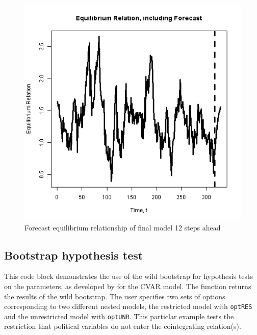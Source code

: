 \documentclass[article]{jss}
\newcommand{\fct}[1]{\code{#1()}}
\begin{document}
\begin{figure}[H]
  \centering
  \includegraphics[scale = 1, keepaspectratio=true]{Figures/forecast_eqbm.png}
  \caption{Forecast equilibrium relationship of final model 12 steps ahead}
  \label{fig:forecast_eqbm}
\end{figure}

\subsection{Bootstrap hypothesis test}
\label{sec:bootstr-hypoth-test}

This code block
demonstrates the use of the wild bootstrap for hypothesis tests on the parameters, as developed by \cite{Boswijk2013} for the CVAR model. 
The function \fct{FCVARboot} returns the results of the wild bootstrap. 
The user specifies two sets of options corresponding to two different nested models, the restricted model with \verb|optRES| and the unrestricted model with \verb|optUNR|. 
This particlar example tests the restriction that political variables do not enter the cointegrating relation(s).

\end{document}

